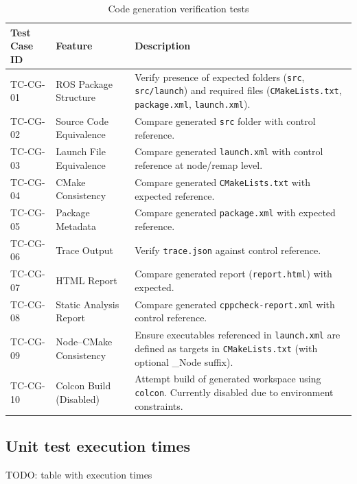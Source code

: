 \bgroup
{}
\begin{xltabular}{\textwidth}{X X X}
	\caption{Code generation verification tests}
	\label{tab:codegen_tests}\\
	\toprule
	Test Case ID & Feature & Description \\
	\midrule
	TC-CG-01 & ROS Package Structure & Verify presence of expected folders (\texttt{src}, \texttt{src/launch}) and required files (\texttt{CMakeLists.txt}, \texttt{package.xml}, \texttt{launch.xml}). \\
	TC-CG-02 & Source Code Equivalence & Compare generated \texttt{src} folder with control reference. \\
	TC-CG-03 & Launch File Equivalence & Compare generated \texttt{launch.xml} with control reference at node/remap level. \\
	TC-CG-04 & CMake Consistency & Compare generated \texttt{CMakeLists.txt} with expected reference. \\
	TC-CG-05 & Package Metadata & Compare generated \texttt{package.xml} with expected reference. \\
	TC-CG-06 & Trace Output & Verify \texttt{trace.json} against control reference. \\
	TC-CG-07 & HTML Report & Compare generated report (\texttt{report.html}) with expected. \\
	TC-CG-08 & Static Analysis Report & Compare generated \texttt{cppcheck-report.xml} with control reference. \\
	TC-CG-09 & Node–CMake Consistency & Ensure executables referenced in \texttt{launch.xml} are defined as targets in \texttt{CMakeLists.txt} (with optional \_Node suffix).  \\
	TC-CG-10 & Colcon Build (Disabled) & Attempt build of generated workspace using \texttt{colcon}. Currently disabled due to environment constraints. \\
	\bottomrule
\end{xltabular}
\egroup


\subsection{Unit test execution times}
\label{app:unit_test_times}

TODO: table with execution times






